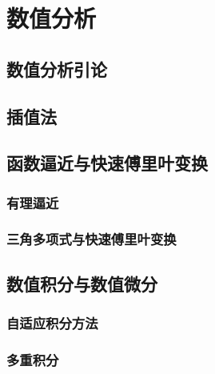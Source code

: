 \part{数值分析}
\chapter{数值分析引论}





\chapter{插值法}







\chapter{函数逼近与快速傅里叶变换}




\section{有理逼近}
\section{三角多项式与快速傅里叶变换}

\chapter{数值积分与数值微分}




\section{自适应积分方法}

\section{多重积分}


